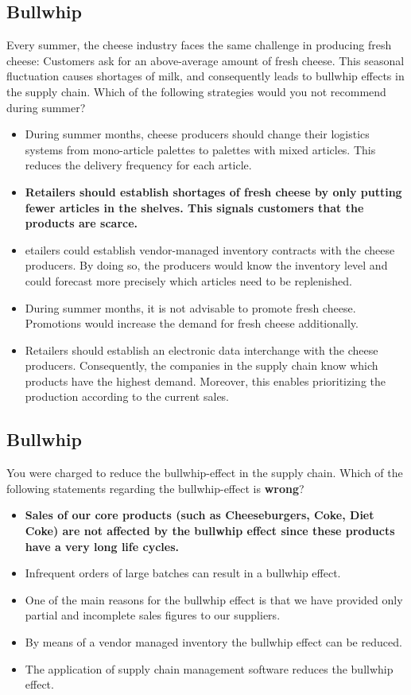 \subsection{Bullwhip}
Every summer, the cheese industry faces the same challenge in producing fresh cheese: Customers ask for an above-average amount of fresh cheese. This seasonal fluctuation causes shortages of milk, and consequently leads to bullwhip effects in the supply chain. Which of the following strategies would you not recommend during summer?

\begin{itemize}
\item During summer months, cheese producers should change their logistics systems from mono-article palettes to palettes with mixed articles. This reduces the delivery frequency for each article.
\item \textbf{Retailers should establish shortages of fresh cheese by only putting fewer articles in the shelves. This signals customers that the products are scarce.}
\item etailers could establish vendor-managed inventory contracts with the cheese producers. By doing so, the producers would know the inventory level and could forecast more precisely which articles need to be replenished. 
\item During summer months, it is not advisable to promote fresh cheese. Promotions would increase the demand for fresh cheese additionally.
\item Retailers should establish an electronic data interchange with the cheese producers. Consequently, the companies in the supply chain know which products have the highest demand. Moreover, this enables prioritizing the production according to the current sales.
\end{itemize}
\subsection{Bullwhip}
You were charged to reduce the bullwhip-effect in the supply chain. Which of the
following statements regarding the bullwhip-effect is \textbf{wrong}?
\begin{itemize}
	\item \textbf{Sales of our core products (such as Cheeseburgers, Coke, Diet Coke) are not affected by the bullwhip effect since these products have a very long life cycles. }
	\item Infrequent orders of large batches can result in a bullwhip effect.
	\item One of the main reasons for the bullwhip effect is that we have provided only partial and incomplete sales figures to our suppliers.
	\item By means of a vendor managed inventory the bullwhip effect can be reduced.
	\item The application of supply chain management software reduces the bullwhip effect.
\end{itemize}
